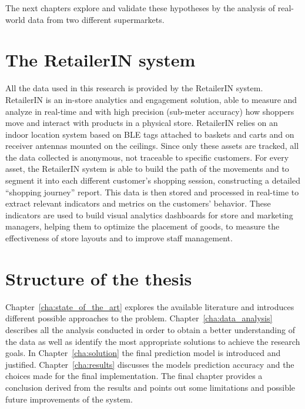 The next chapters explore and validate these hypotheses by the analysis of real-world data from two different supermarkets.

\section{The RetailerIN system}
\label{sec:retailerin_system}

All the data used in this research is provided by the RetailerIN system. RetailerIN is an in-store analytics and engagement solution, able to measure and analyze in real-time and with high precision (sub-meter accuracy) how shoppers move and interact with products in a physical store. RetailerIN relies on an indoor location system based on BLE tags attached to baskets and carts and on receiver antennas mounted on the ceilings. Since only these assets are tracked, all the data collected is anonymous, not traceable to specific customers. For every asset, the RetailerIN system is able to build the path of the movements and to segment it into each different customer’s shopping session, constructing a detailed “shopping journey” report. This data is then stored and processed in real-time to extract relevant indicators and metrics on the customers’ behavior. These indicators are used to build visual analytics dashboards for store and marketing managers, helping them to optimize the placement of goods, to measure the effectiveness of store layouts and to improve staff management.

\section{Structure of the thesis}
\label{sec:structure_of_the_thesis}

Chapter~\ref{cha:state_of_the_art} explores the available literature and introduces different possible approaches to the problem. Chapter~\ref{cha:data_analysis} describes all the analysis conducted in order to obtain a better understanding of the data as well as identify the most appropriate solutions to achieve the research goals. In Chapter~\ref{cha:solution} the final prediction model is introduced and justified. Chapter~\ref{cha:results} discusses the models prediction accuracy and the choices made for the final implementation. The final chapter provides a conclusion derived from the results and points out some limitations and possible future improvements of the system.

\medskip
\clearpage
